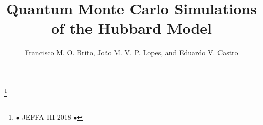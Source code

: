 \documentclass[a0,portrait]{a0poster}
\begin{document}

\title{Quantum Monte Carlo Simulations of the Hubbard Model}

\author{Francisco M. O. Brito, Jo\~ao M. V. P. Lopes, and Eduardo V. Castro}
\vspace{-2cm}
\affiliation{\cfpaddress}


\thanks{\hfill \Wemail \hfill $\bullet$ \hfill JEFFA III 2018 \hfill $\bullet$ \hfill  \hfill}

\makeheader




\vspace{-4.5cm}
\end{document}
